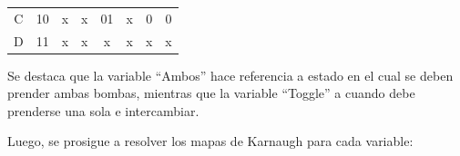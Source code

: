 \begin{table}[H]
\begin{tabular}{|cc|cccc|cc|}
\multicolumn{1}{|c|}{C} & 10                    & x                                                         & x                                                         & 01                                                                             & x                                                         & 0                & 0                 \\ \cline{1-1}
\multicolumn{1}{|c|}{D} & 11                    & x                                                         & x                                                         & x                                                                              & x                                                         & x                & x                 \\ \hline
\end{tabular}
\end{table}

Se destaca que la variable ``Ambos'' hace referencia a estado en el cual se deben prender ambas bombas, mientras que la variable ``Toggle'' a cuando debe prenderse una sola e intercambiar.

Luego, se prosigue a resolver los mapas de Karnaugh para cada variable:

